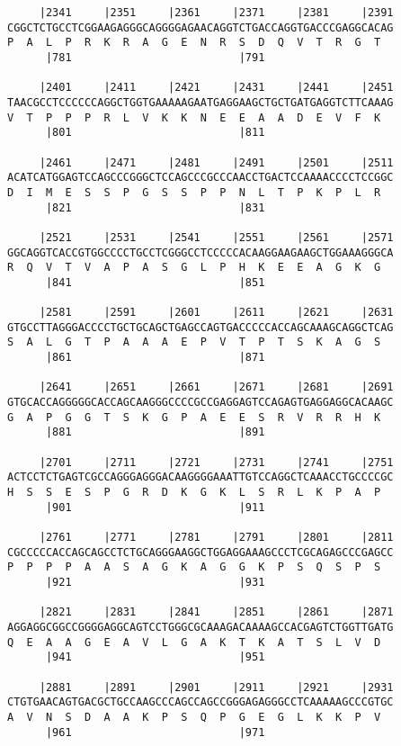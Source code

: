 \documentclass{article}
\begin{document}
\begin{Verbatim}
     |2341     |2351     |2361     |2371     |2381     |2391
CGGCTCTGCCTCGGAAGAGGGCAGGGGAGAACAGGTCTGACCAGGTGACCCGAGGCACAG
P  A  L  P  R  K  R  A  G  E  N  R  S  D  Q  V  T  R  G  T  
      |781                          |791                    
  
     |2401     |2411     |2421     |2431     |2441     |2451
TAACGCCTCCCCCCAGGCTGGTGAAAAAGAATGAGGAAGCTGCTGATGAGGTCTTCAAAG
V  T  P  P  P  R  L  V  K  K  N  E  E  A  A  D  E  V  F  K  
      |801                          |811                    
  
     |2461     |2471     |2481     |2491     |2501     |2511
ACATCATGGAGTCCAGCCCGGGCTCCAGCCCGCCCAACCTGACTCCAAAACCCCTCCGGC
D  I  M  E  S  S  P  G  S  S  P  P  N  L  T  P  K  P  L  R  
      |821                          |831                    
  
     |2521     |2531     |2541     |2551     |2561     |2571
GGCAGGTCACCGTGGCCCCTGCCTCGGGCCTCCCCCACAAGGAAGAAGCTGGAAAGGGCA
R  Q  V  T  V  A  P  A  S  G  L  P  H  K  E  E  A  G  K  G  
      |841                          |851                    
  
     |2581     |2591     |2601     |2611     |2621     |2631
GTGCCTTAGGGACCCCTGCTGCAGCTGAGCCAGTGACCCCCACCAGCAAAGCAGGCTCAG
S  A  L  G  T  P  A  A  A  E  P  V  T  P  T  S  K  A  G  S  
      |861                          |871                    
  
     |2641     |2651     |2661     |2671     |2681     |2691
GTGCACCAGGGGGCACCAGCAAGGGCCCCGCCGAGGAGTCCAGAGTGAGGAGGCACAAGC
G  A  P  G  G  T  S  K  G  P  A  E  E  S  R  V  R  R  H  K  
      |881                          |891                    
  
     |2701     |2711     |2721     |2731     |2741     |2751
ACTCCTCTGAGTCGCCAGGGAGGGACAAGGGGAAATTGTCCAGGCTCAAACCTGCCCCGC
H  S  S  E  S  P  G  R  D  K  G  K  L  S  R  L  K  P  A  P  
      |901                          |911                    
  
     |2761     |2771     |2781     |2791     |2801     |2811
CGCCCCCACCAGCAGCCTCTGCAGGGAAGGCTGGAGGAAAGCCCTCGCAGAGCCCGAGCC
P  P  P  P  A  A  S  A  G  K  A  G  G  K  P  S  Q  S  P  S  
      |921                          |931                    
  
     |2821     |2831     |2841     |2851     |2861     |2871
AGGAGGCGGCCGGGGAGGCAGTCCTGGGCGCAAAGACAAAAGCCACGAGTCTGGTTGATG
Q  E  A  A  G  E  A  V  L  G  A  K  T  K  A  T  S  L  V  D  
      |941                          |951                    
  
     |2881     |2891     |2901     |2911     |2921     |2931
CTGTGAACAGTGACGCTGCCAAGCCCAGCCAGCCGGGAGAGGGCCTCAAAAAGCCCGTGC
A  V  N  S  D  A  A  K  P  S  Q  P  G  E  G  L  K  K  P  V  
      |961                          |971                    
  

\end{Verbatim}
\end{document}

